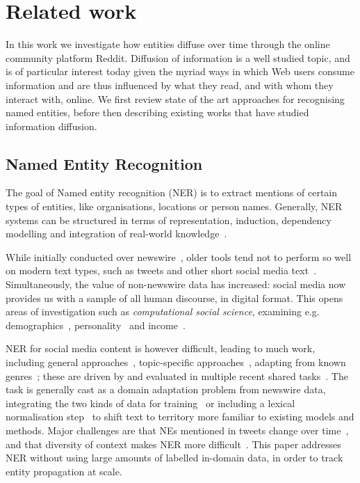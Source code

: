\documentclass[sigconf,anonymous,review]{acmart}
\begin{document}

\section{Related work}
\label{sec:rw}
In this work we investigate how entities diffuse over time through the online community platform Reddit.
Diffusion of information is a well studied topic, and is of particular interest today given the myriad ways in which Web users consume information and are thus influenced by what they read, and with whom they interact with, online.
We first review state of the art approaches for recognising named entities, before then describing existing works that have studied information diffusion.

\subsection{Named Entity Recognition}
The goal of Named entity recognition (NER) is to extract mentions of certain types of entities, like organisations, locations or person names.
Generally, NER systems can be structured in terms of representation, induction, dependency modelling and integration of real-world knowledge~\cite{nadeau2007survey,ratinov2009design}.

While initially conducted over newswire~\cite{tjong2003introduction}, older tools tend not to perform so well on modern text types, such as tweets and other short social media text~\cite{derczynski2015analysis}.
Simultaneously, the value of non-newswire data has increased: social media now provides us with a sample of all human discourse, %
in digital format. This opens areas of investigation such as {\em computational social science}, examining e.g. demographics~\cite{hovy2015user}, personality~\cite{plank2015personality} and income~\cite{preoctiuc2015studying}.

NER for social media content is however difficult, leading to much work, including general approaches~\cite{ritter2011named}, topic-specific approaches~\cite{liu2011recognizing}, adapting from known genres~\cite{plank2014adapting}; these are driven by and evaluated in multiple recent shared tasks~\cite{rowe2015microposts2015,baldwin2015shared}.
The task is generally cast as a domain adaptation problem from newswire data, integrating the two kinds of data for training~\cite{cherryunreasonable} or including a lexical normalisation step~\cite{han2011lexical} to shift text to territory more familiar to existing models and methods.
Major challenges are that NEs mentioned in tweets change over time~\cite{fromreide2014crowdsourcing}, and that diversity of context makes NER more difficult~\cite{derczynski2015analysis}. 
This paper addresses NER without using large amounts of labelled in-domain data, in order to track entity propagation at scale.%
\end{document}
